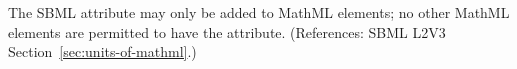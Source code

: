 The SBML attribute  may only be added to MathML 
elements; no other MathML elements are permitted to have the 
attribute.  (References: SBML L2V3 Section~\ref{sec:units-of-mathml}.)
